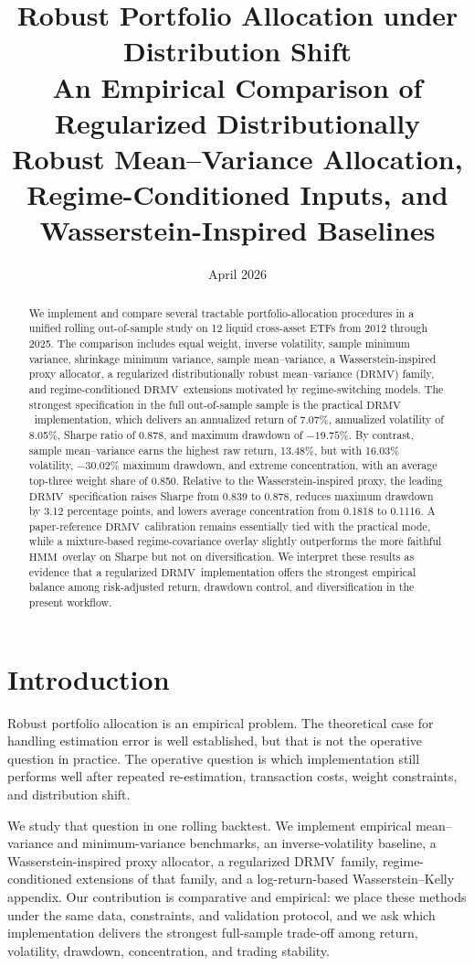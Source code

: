 \documentclass[11pt]{article}
\title{\textbf{Robust Portfolio Allocation under Distribution Shift}\\[0.4em]
\large An Empirical Comparison of Regularized Distributionally Robust Mean--Variance Allocation, Regime-Conditioned Inputs, and Wasserstein-Inspired Baselines}
\author{}
\date{April 2026}
\newcommand{\DRMV}{\ensuremath{\mathrm{DRMV}}}
\newcommand{\HMM}{\ensuremath{\mathrm{HMM}}}
\begin{document}
\maketitle

\begin{abstract}
We implement and compare several tractable portfolio-allocation procedures in a unified rolling out-of-sample study on 12 liquid cross-asset ETFs from 2012 through 2025. The comparison includes equal weight, inverse volatility, sample minimum variance, shrinkage minimum variance, sample mean--variance, a Wasserstein-inspired proxy allocator, a regularized distributionally robust mean--variance (\DRMV) family, and regime-conditioned \DRMV\ extensions motivated by regime-switching models. The strongest specification in the full out-of-sample sample is the practical \DRMV\ implementation, which delivers an annualized return of 7.07\%, annualized volatility of 8.05\%, Sharpe ratio of 0.878, and maximum drawdown of $-19.75\%$. By contrast, sample mean--variance earns the highest raw return, 13.48\%, but with 16.03\% volatility, $-30.02\%$ maximum drawdown, and extreme concentration, with an average top-three weight share of 0.850. Relative to the Wasserstein-inspired proxy, the leading \DRMV\ specification raises Sharpe from 0.839 to 0.878, reduces maximum drawdown by 3.12 percentage points, and lowers average concentration from 0.1818 to 0.1116. A paper-reference \DRMV\ calibration remains essentially tied with the practical mode, while a mixture-based regime-covariance overlay slightly outperforms the more faithful \HMM\ overlay on Sharpe but not on diversification. We interpret these results as evidence that a regularized \DRMV\ implementation offers the strongest empirical balance among risk-adjusted return, drawdown control, and diversification in the present workflow.
\end{abstract}

\section{Introduction}

Robust portfolio allocation is an empirical problem. The theoretical case for handling estimation error is well established, but that is not the operative question in practice. The operative question is which implementation still performs well after repeated re-estimation, transaction costs, weight constraints, and distribution shift.

We study that question in one rolling backtest. We implement empirical mean--variance and minimum-variance benchmarks, an inverse-volatility baseline, a Wasserstein-inspired proxy allocator, a regularized \DRMV\ family, regime-conditioned extensions of that family, and a log-return-based Wasserstein--Kelly appendix. Our contribution is comparative and empirical: we place these methods under the same data, constraints, and validation protocol, and we ask which implementation delivers the strongest full-sample trade-off among return, volatility, drawdown, concentration, and trading stability.
\end{document}
